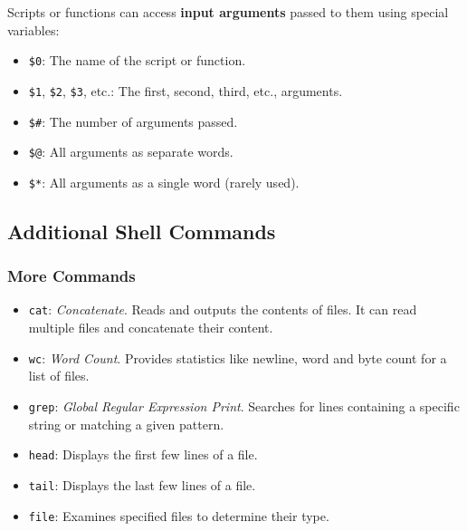 \vspace{-0.3em}

Scripts or functions can access \textbf{input arguments} passed to them using special variables:
\begin{itemize}
    \item \texttt{\$0}: The name of the script or function.
    \item \texttt{\$1}, \texttt{\$2}, \texttt{\$3}, etc.: The first, second, third, etc., arguments.
    \item \texttt{\$\#}: The number of arguments passed.
    \item \texttt{\$@}: All arguments as separate words.
    \item \texttt{\$*}: All arguments as a single word (rarely used).
\end{itemize}

\begin{exampleblock}
\end{exampleblock}

\vspace{-0.5em}

\subsection{Additional Shell Commands}
\vspace{-0.3em}

\subsubsection{More Commands}
\vspace{-0.3em}

\begin{itemize}
    \item \texttt{cat}: \textit{Concatenate}. Reads and outputs the contents of files. It can read multiple files and concatenate their content.
    \item \texttt{wc}: \textit{Word Count}. Provides statistics like newline, word and byte count for a list of files.
    \item \texttt{grep}: \textit{Global Regular Expression Print}. Searches for lines containing a specific string or matching a given pattern.
    \item \texttt{head}: Displays the first few lines of a file.
    \item \texttt{tail}: Displays the last few lines of a file.
    \item \texttt{file}: Examines specified files to determine their type.
\end{itemize}

